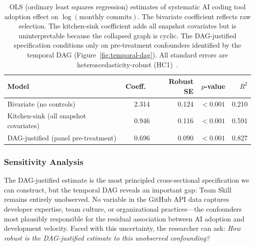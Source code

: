\begin{table}[t]
\centering
\caption{OLS (ordinary least squares regression) estimates of systematic AI coding tool adoption effect on $\log(\text{monthly commits})$.
The bivariate coefficient reflects raw selection.
The kitchen-sink coefficient adds all snapshot covariates but is uninterpretable because the collapsed graph is cyclic.
The DAG-justified specification conditions only on pre-treatment confounders identified by the temporal DAG (Figure~\ref{fig:temporal-dag}).
All standard errors are heteroscedasticity-robust (HC1)~\cite{mackinnon1985heteroskedasticity}.}
\label{tab:ols-comparison}
\small
\begin{tabular}{lrrrr}
\toprule
Model & Coeff.\ & Robust SE & $p$-value & $R^2$ \\
\midrule
Bivariate (no controls) & 2.314 & 0.124 & ${<}0.001$ & 0.210 \\
Kitchen-sink (all snapshot covariates) & 0.946 & 0.116 & ${<}0.001$ & 0.591 \\
DAG-justified (panel pre-treatment) & 0.696 & 0.090 & ${<}0.001$ & 0.827 \\
\bottomrule
\end{tabular}
\end{table}

\subsubsection{Sensitivity Analysis}
\label{sec:cross-sectional-sensitivity}

The DAG-justified estimate is the most principled cross-sectional specification we can construct, but the temporal DAG reveals an important gap: Team Skill remains entirely unobserved.
No variable in the GitHub API data captures developer expertise, team culture, or organizational practices---the confounders most plausibly responsible for the residual association between AI adoption and development velocity.
Faced with this uncertainty, the researcher can ask: \emph{How robust is the DAG-justified estimate to this unobserved confounding?}

